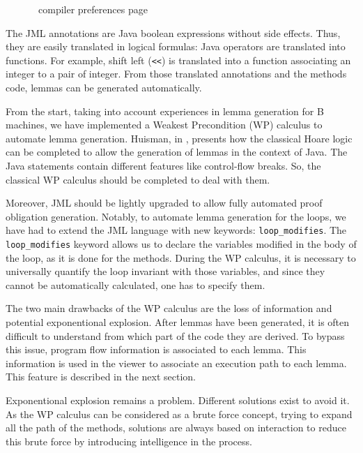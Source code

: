 \begin{figure}[p]
 \caption{\JACK\ compiler preferences page}
 \label{JACKcompprefpage}
\end{figure}
 The JML annotations are Java boolean expressions without side
 effects.  Thus, they are easily translated in logical formulas: Java operators are
 translated into functions. For example, shift left (\texttt{<<}) is
 translated into a function associating an integer to a pair of
 integer.  From those translated annotations and the methods code,
 lemmas can be generated automatically.

 From the start, taking into account
 experiences in lemma generation for B machines, we have implemented a Weakest Precondition (WP) calculus to automate lemma
 generation.  Huisman, in \cite{Huisman:PhD}, presents how the
 classical Hoare logic can be completed to allow the generation of
 lemmas in the context of Java.  The Java statements contain different
 features like control-flow breaks.  So, the classical WP calculus
 should be completed to deal with them.

 Moreover, JML should be lightly upgraded to allow fully automated proof obligation generation.
 Notably, to
 automate lemma generation for the loops, we have had to extend
 the JML language with new keywords: \texttt{loop\_modifies}.
 The \texttt{loop\_modifies} keyword allows us to declare the variables modified in
the body of the loop, as it is done for the methods. During the WP calculus, it is necessary to universally
quantify the loop invariant with those variables, and since they cannot be automatically calculated, one has to
specify them.
 
 The two main drawbacks of the WP calculus are the loss of information and
 potential exponentional explosion.  After lemmas have been generated,
 it is often difficult to understand from which part of the code they
 are derived.  To bypass this issue, program flow information is
 associated to each lemma.  This information is used in the viewer
 to associate an execution path to each lemma. This feature is described in the next section.

 Exponentional explosion remains a problem.  Different solutions exist
 to avoid it.  As the WP calculus can be considered as a brute
 force concept, trying to expand all the path of the methods,
 solutions are always based on interaction to reduce this brute force
 by introducing intelligence in the process.

